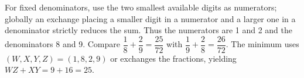 For fixed denominators, use the two smallest available digits as numerators; globally an exchange placing a smaller digit in a numerator and a larger one in a denominator strictly reduces the sum. Thus the numerators are 1 and 2 and the denominators 8 and 9. Compare $\dfrac{1}{8}+\dfrac{2}{9}=\dfrac{25}{72}$ with $\dfrac{1}{9}+\dfrac{2}{8}=\dfrac{26}{72}$. The minimum uses $(W,X,Y,Z)=(1,8,2,9)$ or exchanges the fractions, yielding $WZ+XY=9+16=\boxed{25}$.
